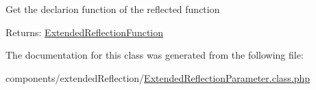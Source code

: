 Get the declarion function of the reflected function

\begin{Desc}
\item[Returns:]\hyperlink{class_extended_reflection_function}{ExtendedReflectionFunction} \end{Desc}


The documentation for this class was generated from the following file:\begin{CompactItemize}
\item 
components/extendedReflection/\hyperlink{_extended_reflection_parameter_8class_8php}{ExtendedReflectionParameter.class.php}\end{CompactItemize}
